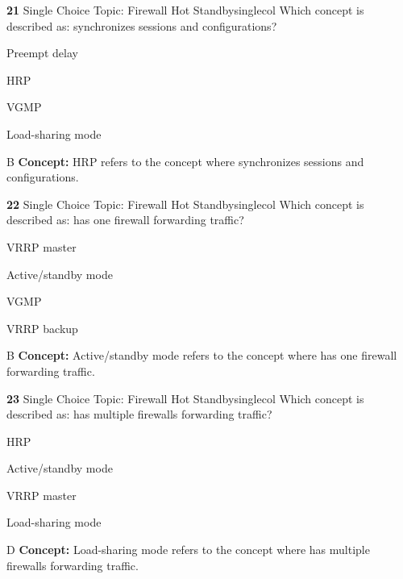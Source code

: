 \documentclass[10pt,a4paper]{article}
\begin{document}
\begin{qcard}{\color{white}\textbf{21} \hfill \small Single Choice \textbar{} Topic: Firewall Hot Standby}{singlecol}
Which concept is described as: synchronizes sessions and configurations?

\begin{qoptions}
\item Preempt delay
\item HRP
\item VGMP
\item Load-sharing mode
\end{qoptions}
\begin{explainbox}{B}
\textbf{Concept:} HRP refers to the concept where synchronizes sessions and configurations.
\end{explainbox}
\end{qcard}

\begin{qcard}{\color{white}\textbf{22} \hfill \small Single Choice \textbar{} Topic: Firewall Hot Standby}{singlecol}
Which concept is described as: has one firewall forwarding traffic?

\begin{qoptions}
\item VRRP master
\item Active/standby mode
\item VGMP
\item VRRP backup
\end{qoptions}
\begin{explainbox}{B}
\textbf{Concept:} Active/standby mode refers to the concept where has one firewall forwarding traffic.
\end{explainbox}
\end{qcard}

\begin{qcard}{\color{white}\textbf{23} \hfill \small Single Choice \textbar{} Topic: Firewall Hot Standby}{singlecol}
Which concept is described as: has multiple firewalls forwarding traffic?

\begin{qoptions}
\item HRP
\item Active/standby mode
\item VRRP master
\item Load-sharing mode
\end{qoptions}
\begin{explainbox}{D}
\textbf{Concept:} Load-sharing mode refers to the concept where has multiple firewalls forwarding traffic.
\end{explainbox}
\end{qcard}
\end{document}
